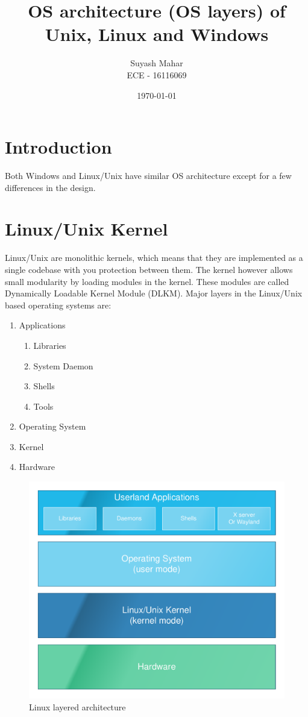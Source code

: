 \documentclass[a4,11pt]{article}
\title{OS architecture (OS layers) of Unix, Linux and Windows}
\author{Suyash Mahar \\
  ECE - 16116069
}
\date{\today}
\begin{document}
\maketitle


\section{Introduction}
Both Windows and Linux/Unix have similar OS architecture except for a
few differences in the design.

\section{Linux/Unix Kernel}
Linux/Unix are monolithic kernels, which means that they are
implemented as a single codebase with you protection between them. The
kernel however allows small modularity by loading modules in the
kernel. These modules are called Dynamically Loadable Kernel Module
(DLKM). Major layers in the Linux/Unix based operating systems are:

\begin{enumerate}
\item Applications
  \begin{enumerate}
  \item Libraries
  \item System Daemon
  \item Shells
  \item Tools
  \end{enumerate}
\item Operating System
\item Kernel
\item Hardware
\end{enumerate}

\begin{figure}[!ht]
  \centering
  \includegraphics[width=0.5\linewidth]{images/linux-layers.pdf}
  \caption{Linux layered architecture}
  \label{fig:linux-layered}
\end{figure}
\end{document}
